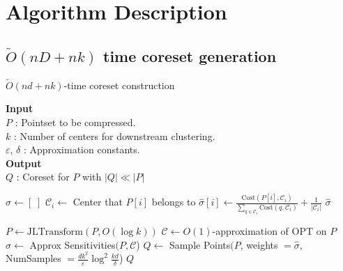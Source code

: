 \documentclass{article}
\theoremstyle{definition}
\begin{document}
\section{Algorithm Description}

\subsection{$\tilde{O}(nD + nk)$ time coreset generation}

\begin{algorithm}
\caption{$\tilde{O}(nd + nk)$-time coreset construction}
\label{naive_coreset_alg}
\hspace*{\algorithmicindent} \textbf{Input} \\
\hspace*{\algorithmicindent*2} $P$ : Pointset to be compressed. \\
\hspace*{\algorithmicindent*2} $k$ : Number of centers for downstream clustering. \\
\hspace*{\algorithmicindent*2} $\varepsilon$, $\delta$ : Approximation constants. \\
\hspace*{\algorithmicindent} \textbf{Output} \\
\hspace*{\algorithmicindent*2} $Q$ : Coreset for $P$ with $|Q| \ll |P|$
\begin{algorithmic}[1]

    \item[]
    \State $\hat{\sigma} \gets [\; ]$
    \State $\mathcal{C}_i \gets $ Center that $P[i]$ belongs to 
    \State $\hat{\sigma}[i] \gets \frac{\text{Cost}(P[i], \mathcal{C}_i)}{\sum_{q \in \mathcal{C}_i}\text{Cost}(q, \mathcal{C}_i)} + \frac{1}{|\mathcal{C}_i|}$
    \EndFor
    \State \Return $\hat{\sigma}$
    \EndFunction
    \item[]

    \State $P \gets \text{JLTransform}(P, O(\log k))$
    \State $\mathcal{C} \gets O(1)$-approximation of OPT on $P$
    \State $\hat{\sigma} \gets $ Approx Sensitivities$(P, \mathcal{C}$)
    \State $Q \gets $ Sample Points$(P$, weights $=\hat{\sigma}$, NumSamples $=\frac{dk^2}{\varepsilon} \log ^2 \frac{kd}{\delta}$)
    \State \Return $Q$
    \EndFunction
    
\end{algorithmic}
\end{algorithm}
\end{document}
